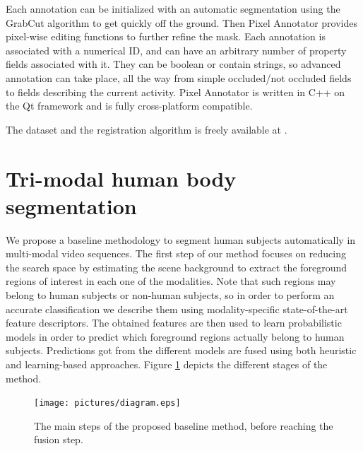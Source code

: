 \documentclass[10pt,twocolumn,letterpaper]{article}
\begin{document}
Each annotation can be initialized with an automatic segmentation using the GrabCut algorithm \cite{rother2004grabcut} to get quickly off the ground. Then Pixel Annotator provides pixel-wise editing functions to further refine the mask. Each annotation is associated with a numerical ID, and can have an arbitrary number of property fields associated with it. They can be boolean or contain strings, so advanced annotation can take place, all the way from simple occluded/not occluded fields to fields describing the current activity. Pixel Annotator is written in C++ on the Qt framework and is fully cross-platform compatible.

The dataset and the registration algorithm is freely available at \cite{vapgroup}.


\section{Tri-modal human body segmentation}
\label{sec:trimodalhumanbodysegmentation}


We propose a baseline methodology to segment human subjects automatically in multi-modal video sequences. The first step of our method focuses on reducing the search space by estimating the scene background to extract the foreground regions of interest in each one of the modalities. Note that such regions may belong to human subjects or non-human subjects, so in order to perform an accurate classification we describe them using  modality-specific state-of-the-art feature descriptors. The obtained features are then used to learn probabilistic models in order to predict which foreground regions actually belong to human subjects. Predictions got from the different models are fused using both heuristic and learning-based approaches. Figure \ref{fig:baseline} depicts the different stages of the method.

\begin{figure}[ht!]
	\centering
	\texttt{[image: pictures/diagram.eps]}
	\caption{The main steps of the proposed baseline method, before reaching the fusion step.}
	\label{fig:baseline}
\end{figure}

\end{document}
